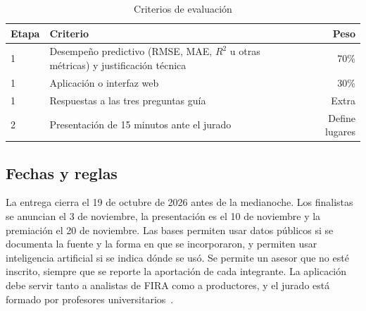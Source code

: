 \begin{table}[!t]
\caption{Criterios de evaluación}\label{tab:evaluacion}
\centering\footnotesize
\begin{tabularx}{\columnwidth}{@{}lXr@{}}
\toprule
Etapa & Criterio & Peso \\
\midrule
1 & Desempeño predictivo (RMSE, MAE, $R^2$ u otras métricas) y justificación técnica & 70\% \\
1 & Aplicación o interfaz web & 30\% \\
1 & Respuestas a las tres preguntas guía & Extra \\
2 & Presentación de 15 minutos ante el jurado & Define lugares \\
\bottomrule
\end{tabularx}
\end{table}

\subsection{Fechas y reglas}
La entrega cierra el 19 de octubre de 2026 antes de la medianoche. Los finalistas se anuncian el 3 de noviembre, la
presentación es el 10 de noviembre y la premiación el 20 de noviembre. Las bases permiten usar datos públicos si se
documenta la fuente y la forma en que se incorporaron, y permiten usar inteligencia artificial si se indica dónde se usó. Se permite un asesor que no esté inscrito, siempre que se reporte la aportación de cada integrante. La aplicación debe servir tanto a analistas de FIRA como a productores, y el jurado está formado por profesores universitarios~\cite{preguntas}.
